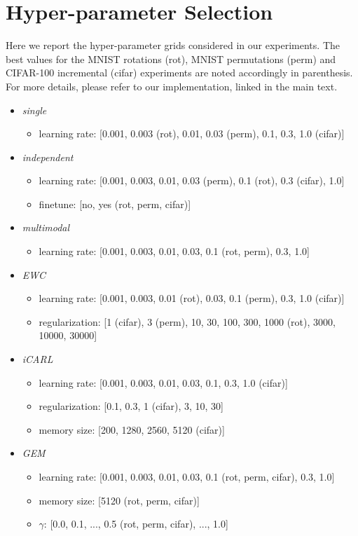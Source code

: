 \documentclass{article}
\begin{document}
\section{Hyper-parameter Selection} \label{sec:apphyper}
Here we report the hyper-parameter grids considered in our experiments. The
best values for the MNIST rotations (rot), MNIST permutations (perm) and
CIFAR-100 incremental (cifar) experiments are noted accordingly in parenthesis.
For more details, please refer to our implementation, linked in the main text.
\begin{itemize}
  \item \emph{single}
  \begin{itemize}
    \item learning rate: [0.001, 0.003 (rot), 0.01, 0.03 (perm), 0.1, 0.3, 1.0 (cifar)]
  \end{itemize}
  \item \emph{independent}
  \begin{itemize}
    \item learning rate: [0.001, 0.003, 0.01, 0.03 (perm), 0.1 (rot), 0.3 (cifar), 1.0]
    \item finetune: [no, yes (rot, perm, cifar)]
  \end{itemize}
  \item \emph{multimodal}
  \begin{itemize}
    \item learning rate: [0.001, 0.003, 0.01, 0.03, 0.1 (rot, perm), 0.3, 1.0]
  \end{itemize}
  \item \emph{EWC}
  \begin{itemize}
    \item learning rate: [0.001, 0.003, 0.01 (rot), 0.03, 0.1 (perm), 0.3, 1.0 (cifar)]
    \item regularization: [1 (cifar), 3 (perm), 10, 30, 100, 300, 1000 (rot), 3000, 10000, 30000]
  \end{itemize}
  \item \emph{iCARL}
  \begin{itemize}
    \item learning rate: [0.001, 0.003, 0.01, 0.03, 0.1, 0.3, 1.0 (cifar)]
    \item regularization: [0.1, 0.3, 1 (cifar), 3, 10, 30]
    \item memory size:    [200, 1280, 2560, 5120 (cifar)] 
  \end{itemize}
  \item \emph{GEM}
  \begin{itemize}
    \item learning rate: [0.001, 0.003, 0.01, 0.03, 0.1 (rot, perm, cifar), 0.3, 1.0]
    \item memory size: [5120 (rot, perm, cifar)]
    \item $\gamma$: [0.0, 0.1, ..., 0.5 (rot, perm, cifar), ..., 1.0]
  \end{itemize}
\end{itemize}
\end{document}
